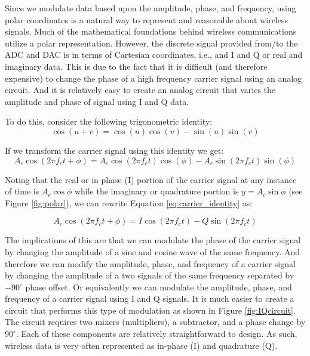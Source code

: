 Since we modulate data based upon the amplitude, phase, and frequency, using polar coordinates is a natural way to represent and reasonable about wireless signals. Much of the mathematical foundations behind wireless communications utilize a polar representation. However, the discrete signal provided from/to the ADC and DAC is in terms of Cartesian coordinates, i.e., and I and Q or real and imaginary data. This is due to the fact that it is difficult (and therefore expensive) to change the phase of a high frequency carrier signal using an analog circuit. And it is relatively easy to create an analog circuit that varies the amplitude and phase of signal using I and Q data.

To do this, consider the following trigonometric identity:
\begin{equation}
\cos(u + v) = \cos(u) \cos(v) - \sin(u) \sin(v)
\end{equation}

If we transform the carrier signal using this identity we get:
\begin{equation}
A_c \cos (2 \pi f_c t + \phi) = A_c \cos (2 \pi f_c t) \cos(\phi) - A_c \sin (2 \pi f_c t) \sin(\phi)
\label{eq:carrier_identity}
\end{equation}

Noting that the real or in-phase (I) portion of the carrier signal at any instance of time is $A_c \cos \phi$ while the imaginary or quadrature portion is $y = A_c \sin \phi$ (see Figure \ref{fig:polar}), we can rewrite Equation \ref{eq:carrier_identity} as:

\begin{equation}
A_c \cos (2 \pi f_c t + \phi) = I \cos (2 \pi f_c t)  - Q \sin (2 \pi f_c t)
\end{equation}

The implications of this are that we can modulate the phase of the carrier signal by changing the amplitude of a sine and cosine wave of the same frequency. And therefore we can modify the amplitude, phase, and frequency of a carrier signal by changing the amplitude of a two signals of the same frequency separated by $-90^{\circ}$ phase offset. Or equivalently we can modulate the amplitude, phase, and frequency of a carrier signal using I and Q signals. It is much easier to create a circuit that performs this type of modulation as shown in Figure \ref{fig:IQcircuit}. The circuit requires two mixers (multipliers), a subtractor, and a phase change by $90^{\circ}$. Each of these components are relatively straightforward to design. As such, wireless data is very often represented as in-phase (I) and quadrature (Q).

